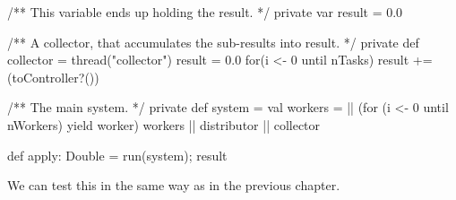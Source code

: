 
\begin{slide}

\begin{scala}
  /** This variable ends up holding the result. */
  private var result = 0.0

  /** A collector, that accumulates the sub-results into result. */
  private def collector = thread("collector"){
    result = 0.0
    for(i <- 0 until nTasks) result += (toController?())
  }
\end{scala}
\end{slide}


\begin{slide}

\begin{scala}
  /** The main system. */
  private def system = {
    val workers = || (for (i <- 0 until nWorkers) yield worker)
    workers || distributor || collector
  }

  def apply: Double = { run(system); result } 
\end{scala}
%


We can test this in the same way as in the previous chapter.
\end{slide}
